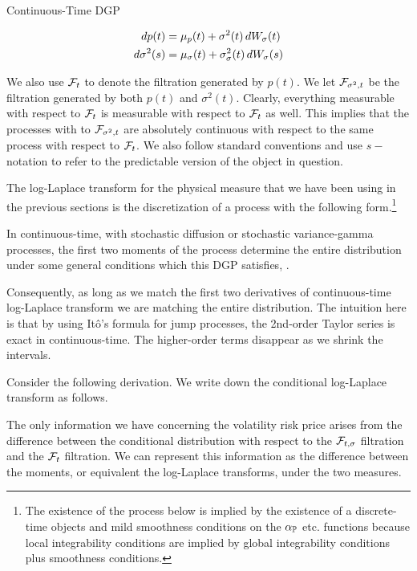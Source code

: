 \documentclass[11pt, letterpaper, twoside, final]{article}
\begin{document}
\begin{defn}{Continuous-Time DGP}
    \label{defn:cont_time_dgp}

    \begin{align}
        \mathop{}\!d p(t) &= \mu_{p}(t) + \sigma^2(t) \mathop{}\!d W_{\sigma}(t)  \\
        \mathop{}\!d \sigma^2(s)  &= \mu_{\sigma}(t) + \sigma_{\sigma}^2(t) \mathop{}\!d W_{\sigma}(s) 
    \end{align}

\end{defn}

We also use  $\mathcal{F}_t$ to denote the filtration generated by $p(t)$.
We let $\mathcal{F}_{\sigma^2, t}$ be the filtration generated by both $p(t)$ and $\sigma^2(t)$.
Clearly, everything measurable with respect to $\mathcal{F}_t$ is measurable with respect to $\mathcal{F}_t$ as well.
This implies that the processes with to $\mathcal{F}_{\sigma^2, t}$ are absolutely continuous with respect to the same
process with respect to $\mathcal{F}_t$.
We also follow standard conventions and use $s-$ notation to refer to the predictable version of the object in
question. 

The log-Laplace transform for the physical measure that we have been using in the previous sections is the
discretization of a process with the following form.\footnote{The existence of the process below is implied
    by the existence of a discrete-time objects and mild smoothness conditions on the $\alpha_{\mathbb{P}}$ etc.\@
    functions because local integrability conditions are implied by global integrability conditions plus
smoothness conditions.}

In continuous-time, with stochastic diffusion or stochastic variance-gamma processes, the first two moments of the
process determine the entire distribution under some general conditions which this DGP satisfies,
\parencite{sangrey2018jumps}.

Consequently, as long as we match the first two derivatives of continuous-time log-Laplace transform we are
matching the entire distribution.
The intuition here is that by using It\^{o}'s formula for jump  processes, the 2nd-order Taylor series is exact in
continuous-time.
The higher-order  terms disappear as we shrink the intervals. 


Consider the following derivation.
We write down the conditional log-Laplace transform as follows.

The only information we have concerning the volatility risk price arises from the difference between the
conditional distribution with respect to the $\mathcal{F}_{t, \sigma}$ filtration and the $\mathcal{F}_{t}$ filtration.
We can represent this information as the difference between the moments, or equivalent the log-Laplace
transforms, under the two measures. 
\end{document}
